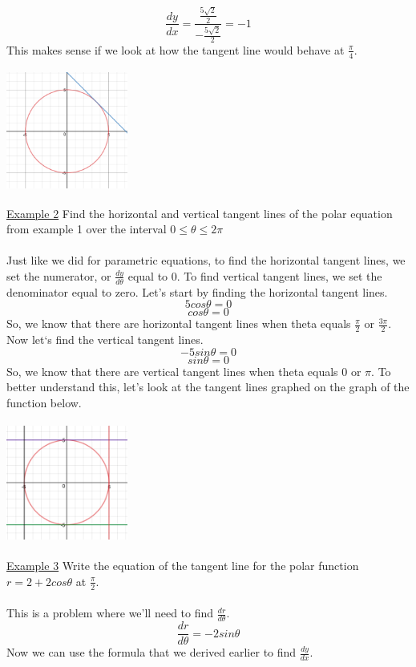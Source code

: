 \documentclass[a4paper,openright, 14pt]{article}
\begin{document}
$$\frac{dy}{dx}=\frac{\frac{5\sqrt2}{2}}{-\frac{5\sqrt2}{2}}=-1$$
This makes sense if we look at how the tangent line would behave at $\frac{\pi}{4}$.
\begin{center}
    \includegraphics[height=4cm, width=4cm]{Images/negone.png}
\end{center}
\underline{Example 2}
Find the horizontal and vertical tangent lines of the polar equation from example 1 over the interval $0\leq \theta \leq 2\pi$\\\\
Just like we did for parametric equations, to find the horizontal tangent lines, we set the numerator, or $\frac{dy}{d\theta}$  equal to 0. To find vertical tangent lines, we set the denominator equal to zero. Let’s start by finding the horizontal tangent lines.
$$5cos\theta=0$$
$$cos\theta=0$$
So, we know that there are horizontal tangent lines when theta equals $\frac{\pi}{2}$ or $\frac{3\pi}{2}$.
Now let‘s find the vertical tangent lines.
$$-5sin\theta=0$$
$$sin\theta=0$$
So, we know that there are vertical tangent lines when theta equals 0 or $\pi$. To better understand this, let’s look at the tangent lines graphed on the graph of the function below.
\begin{center}
    \includegraphics[height=4cm, width=4cm]{Images/stuff.png}
\end{center}
\underline{Example 3}
Write the equation of the tangent line for the polar function $r=2+2cos\theta$ at $\frac{\pi}{2}$.\\\\
This is a problem where we’ll need to find $\frac{dr}{d\theta}$. 
$$\frac{dr}{d\theta}=-2sin\theta$$
Now we can use the formula that we derived earlier to find $\frac{dy}{dx}$.
\end{document}

